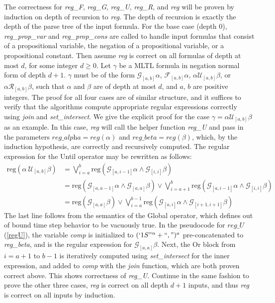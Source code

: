 \documentclass[runningheads]{llncs}
\begin{document}
The correctness for \textit{reg\_F}, \textit{reg\_G}, \textit{reg\_U}, \textit{reg\_R}, and \textit{reg} will be proven by induction on depth of recursion to \textit{reg}. 
The depth of recursion is exactly the depth of the parse tree of the input formula.
For the base case (depth $0$), \textit{reg\_prop\_var} and \textit{reg\_prop\_cons} are called to handle input formulas that consist of a propositional variable, the negation of a propositional variable, or a propositional constant.
Then assume \textit{reg} is correct on all formulas of depth at most $d$, for some integer $d \geq 0$. Let $\gamma$ be a MLTL formula in negation normal form of depth $d + 1$. $\gamma$ must be of the form $\mathcal{G}_{[a,b]}\alpha$, $\mathcal{F}_{[a,b]}\alpha$, $\alpha \mathcal{U}_{[a,b]} \beta$, or $\alpha \mathcal{R}_{[a,b]} \beta$, such that $\alpha$ and $\beta$ are of depth at most $d$, and $a$, $b$ are positive integers. The proof for all four cases are of similar structure, and it suffices to verify that the algorithms compute appropriate regular expressions correctly using \textit{join} and \textit{set\_intersect}.
We give the explicit proof for the case $\gamma = \alpha \mathcal{U}_{[a,b]} \beta$ as an example.
In this case, \textit{reg} will call the helper function \textit{reg\_U} and pass in the parameters $\textit{reg\_alpha} = \textit{reg}(\alpha)$ and $\textit{reg\_beta} = \textit{reg}(\beta)$, which, by the induction hypothesis, are correctly and recursively computed.
The regular expression for the Until operator may be rewritten as follows: 
\begin{align*}
   \text{reg}(\alpha \ \mathcal{U}_{[a,b]} \beta) &=  \bigvee_{i=a}^{b} \text{reg}\left(\mathcal{G}_{[a,i-1]}\alpha \land \mathcal{G}_{[i, i]} \beta\right) \\
   &= \text{reg}\left(\mathcal{G}_{[a,a-1]}\alpha \land \mathcal{G}_{[a, a]} \beta\right) \lor \bigvee_{i=a+1}^{b} \text{reg}\left(\mathcal{G}_{[a,i-1]}\alpha \land \mathcal{G}_{[i, i]} \beta\right) \\
   &= \text{reg}\left(\mathcal{G}_{[a, a]} \beta \right)\lor \bigvee_{i=a}^{b-1} \text{reg}\left(\mathcal{G}_{[a,i]}\alpha \land \mathcal{G}_{[i+1, i+1]} \beta\right)
\end{align*}
The last line follows from the semantics of the Global operator, which defines out of bound time step behavior to be vacuously true. In the pseudocode for $reg\_U$ (\ref{regU}), the variable \textit{comp} is initialized to $(`1S"^n + ``,")^a$ pre-concatenated to \textit{reg\_beta}, and is the regular expression for $\mathcal{G}_[a, a] \beta$. Next, the Or block from $i = a + 1$ to $b - 1$ is iteratively computed using \textit{set\_intersect} for the inner expression, and added to \textit{comp} with the \textit{join} function, which are both proven correct above. This shows correctness of \textit{reg\_U}.
Continue in the same fashion to prove the other three cases, \textit{reg} is correct on all depth $d+1$ inputs, and thus \textit{reg} is correct on all inputs by induction.
\end{document}
